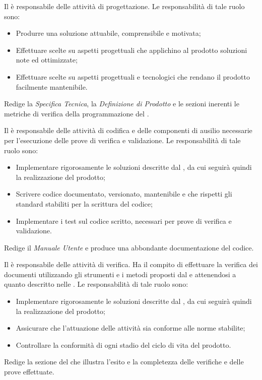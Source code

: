 \documentclass[12pt,a4paper]{article}
\begin{document}
Il \PG{} è responsabile delle attività di progettazione. Le responsabilità di tale
ruolo sono:
\begin{itemize}
	\item Produrre una soluzione attuabile, comprensibile e motivata;
	\item Effettuare scelte su aspetti progettuali che applichino al prodotto soluzioni note ed ottimizzate;
	\item Effettuare scelte su aspetti progettuali e tecnologici che rendano il prodotto facilmente mantenibile.
\end{itemize}
Redige la \textit{Specifica Tecnica}, la \textit{Definizione di Prodotto} e le sezioni inerenti le metriche di verifica della programmazione del \PdQ{}.

Il \PR{} è responsabile delle attività di codifica e delle componenti di ausilio necessarie per l'esecuzione delle prove di verifica e validazione. Le responsabilità di tale ruolo sono:
\begin{itemize}
	\item Implementare rigorosamente le soluzioni descritte dal \PG{}, da cui seguirà quindi la realizzazione del prodotto;
	\item Scrivere codice documentato, versionato, mantenibile e che rispetti gli standard stabiliti per la scrittura del codice;
	\item Implementare i test sul codice scritto, necessari per prove di verifica e validazione.
\end{itemize}
Redige il \textit{Manuale Utente} e produce una abbondante documentazione del codice.

Il \VR{} è responsabile delle attività di verifica. Ha il compito di effettuare la verifica dei documenti utilizzando gli strumenti e i metodi proposti dal \PdQ{} e attenendosi a quanto descritto nelle \NdP{}. 
Le responsabilità di tale ruolo sono:
\begin{itemize}
	\item Implementare rigorosamente le soluzioni descritte dal \PG{}, da cui seguirà quindi la realizzazione del prodotto;
	\item Assicurare che l'attuazione delle attività sia conforme alle norme stabilite;
	\item Controllare la conformità di ogni stadio del ciclo di vita del prodotto.
\end{itemize}
Redige la sezione del \PdQ{} che illustra l'esito e la completezza delle verifiche
e delle prove effettuate.
\end{document}
